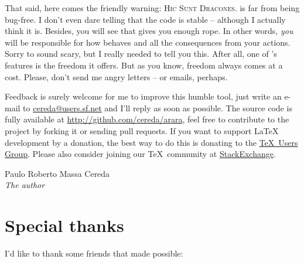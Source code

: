 \documentclass[a4paper,twoside,12pt]{memoir}
\begin{document}
That said, here comes the friendly warning: \textsc{Hic Sunt Dracones}. \arara 
is far from being bug-free. I don't even dare telling that the code is stable -- 
although I actually think it is. Besides, you will see that \arara gives you 
enough rope. In other words, \emph{you} will be responsible for how \arara 
behaves and all the consequences from your actions. Sorry to sound scary, but I 
really needed to tell you this. After all, one of \arara's features is the 
freedom it offers. But as you know, freedom always comes at a cost. Please, 
don't send me angry letters -- or emails, perhaps.

Feedback is surely welcome for me to improve this humble tool, just write an 
e-mail to \url{cereda@users.sf.net} and I'll reply as soon as possible. The 
source code is fully available at \url{http://github.com/cereda/arara}, feel 
free to contribute to the project by forking it or sending pull requests. If you 
want to support \LaTeX{} development by a donation, the best way to do this is 
donating to the \href{http://www.tug.org/}{\TeX\ Users Group}. Please also 
consider joining our \TeX\ community at 
\href{http://tex.stackexchange.com}{StackExchange}.

\vfill

\begin{flushright}
Paulo Roberto Massa Cereda\\
\emph{The author}
\end{flushright}

\cleardoublepage

\section*{Special thanks}

I'd like to thank some friends that made \arara possible:
\end{document}
